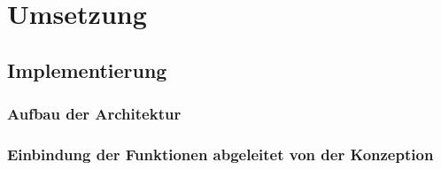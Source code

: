 \chapter{Umsetzung}
\section{Implementierung}
\subsection{Aufbau der Architektur}
\subsection{Einbindung der Funktionen abgeleitet von der Konzeption}